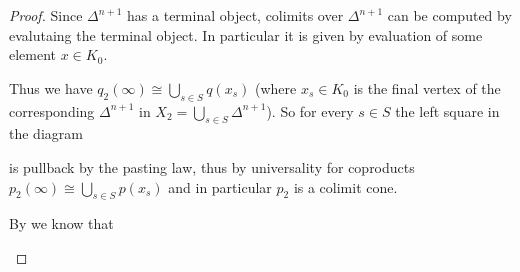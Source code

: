 \begin{lemma}
\begin{proof}
        Since $\Delta^{n+1}$ has a terminal object, colimits over $\Delta^{n+1}$ can be computed by evalutaing the terminal object.
        In particular it is given by evaluation of some element $x\in K_0$.

        Thus we have $q_2(\infty)\cong\bigcup\limits_{s\in S} q(x_s)$ (where $x_s\in K_0$ is the final vertex of the corresponding $\Delta^{n+1}$ in $X_2=\bigcup\limits_{s\in S} \Delta^{n+1}$).
        So for every $s\in S$ the left square in the diagram
        \begin{center}
        \end{center}
        is pullback by the pasting law, thus by universality for coproducts $p_2(\infty)\cong\bigcup\limits_{s\in S} p(x_s)$ and in particular $p_2$ is a colimit cone.
        
        By %
        we know that 
        \begin{center}
\end{center}
\end{proof}
\end{lemma}
